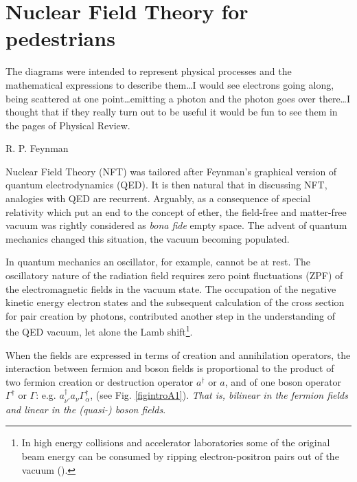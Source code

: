 \section{Nuclear Field Theory for pedestrians}\label{appintroA}
\epigraph{The diagrams were intended to represent physical processes and the mathematical expressions to describe them\dots I would see electrons going along, being scattered at one point\dots emitting a photon and the photon goes over there\dots I thought that if they really turn out to be useful it would be fun to see them in the pages of Physical Review.}{R. P. Feynman}
Nuclear Field Theory (NFT) was tailored after Feynman's graphical version of quantum electrodynamics (QED). It is then natural that in discussing NFT, analogies with QED are recurrent.   Arguably, as a consequence of special relativity which put an end to the concept of ether, the field-free and matter-free vacuum was rightly considered as \textit{bona fide} empty space. The advent of quantum mechanics changed this situation,  the vacuum becoming populated.

 In quantum mechanics an oscillator, for example, cannot be at rest. The oscillatory nature of the radiation field requires zero point fluctuations (ZPF) of the electromagnetic fields in the vacuum state. The occupation of the negative kinetic energy electron states and the subsequent calculation of the cross section for pair creation by photons, contributed another step in the understanding of the QED vacuum, let alone the Lamb shift\footnote{In high energy collisions and accelerator laboratories some of the original beam energy can be consumed by ripping electron-positron pairs out of the vacuum (\cite{Bruce:07}).}.


When the fields are expressed in terms of creation and annihilation operators, the interaction between  fermion and boson fields is proportional to the product of two fermion creation or destruction operator $a^\dagger$ or $a$, and of one boson operator $\Gamma^\dagger$ or $\Gamma$: e.g. $a^\dagger_{\nu'}a_\nu\Gamma_\alpha^\dagger$, (see Fig. \ref{figintroA1}). \textit{That is,  bilinear in the fermion fields and linear in the (quasi-) boson fields}.

